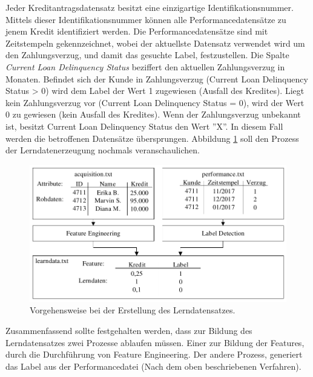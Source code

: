 Jeder Kreditantragsdatensatz besitzt eine einzigartige Identifikationsnummer. Mittels dieser Identifikationsnummer können alle Performancedatensätze zu jenem Kredit identifiziert werden. Die Performancedatensätze sind mit Zeitstempeln gekennzeichnet, wobei der aktuellste Datensatz verwendet wird um den Zahlungsverzug, und damit das gesuchte Label, festzustellen. Die Spalte \textit{Current Loan Delinquency Status} beziffert den aktuellen Zahlungsverzug in Monaten. Befindet sich der Kunde in Zahlungsverzug (Current Loan Delinquency Status > 0) wird dem Label der Wert 1 zugewiesen (Ausfall des Kredites). Liegt kein Zahlungsverzug vor (Current Loan Delinquency Status = 0), wird der Wert 0 zu gewiesen (kein Ausfall des Kredites). Wenn der Zahlungsverzug unbekannt ist, besitzt Current Loan Delinquency Status den Wert ''X''. In diesem Fall werden die betroffenen Datensätze übersprungen. Abbildung \ref{fig:cleansing} soll den Prozess der Lerndatenerzeugung nochmals veranschaulichen.

\begin{figure}[ht]
\centering
\includegraphics{images/cleansing.pdf}
\caption{Vorgehensweise bei der Erstellung des Lerndatensatzes.}
\label{fig:cleansing}
\end{figure}  

Zusammenfassend sollte festgehalten werden, dass zur Bildung des Lerndatensatzes zwei Prozesse ablaufen müssen. Einer zur Bildung der Features, durch die Durchführung von Feature Engineering. Der andere Prozess, generiert das Label aus der Performancedatei (Nach dem oben beschriebenen Verfahren). 
 
